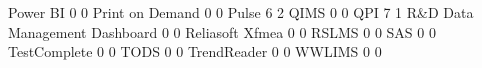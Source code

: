 \documentclass{article}
\begin{document}
\begin{Schunk}
\begin{Soutput}
  Power BI                                                     0            0
  Print on Demand                                              0            0
  Pulse                                                        6            2
  QIMS                                                         0            0
  QPI                                                          7            1
  R&D Data Management Dashboard                                0            0
  Reliasoft Xfmea                                              0            0
  RSLMS                                                        0            0
  SAS                                                          0            0
  TestComplete                                                 0            0
  TODS                                                         0            0
  TrendReader                                                  0            0
  WWLIMS                                                       0            0
                                          

\end{Soutput}
\end{Schunk}
\end{document}
